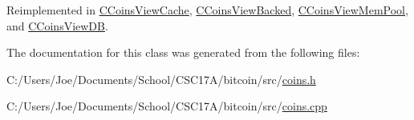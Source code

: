 Reimplemented in \hyperlink{class_c_coins_view_cache_a25dddabe8734fc9823112763494da72b}{C\+Coins\+View\+Cache}, \hyperlink{class_c_coins_view_backed_a6a769cf9cc55128dea8e1a2798056e71}{C\+Coins\+View\+Backed}, \hyperlink{class_c_coins_view_mem_pool_a965e6c8e378fe937620ba2c180d1ed74}{C\+Coins\+View\+Mem\+Pool}, and \hyperlink{class_c_coins_view_d_b_a4d08cf2d3440c1de4e48cfddd67962d7}{C\+Coins\+View\+D\+B}.



The documentation for this class was generated from the following files\+:\begin{DoxyCompactItemize}
\item 
C\+:/\+Users/\+Joe/\+Documents/\+School/\+C\+S\+C17\+A/bitcoin/src/\hyperlink{coins_8h}{coins.\+h}\item 
C\+:/\+Users/\+Joe/\+Documents/\+School/\+C\+S\+C17\+A/bitcoin/src/\hyperlink{coins_8cpp}{coins.\+cpp}\end{DoxyCompactItemize}
